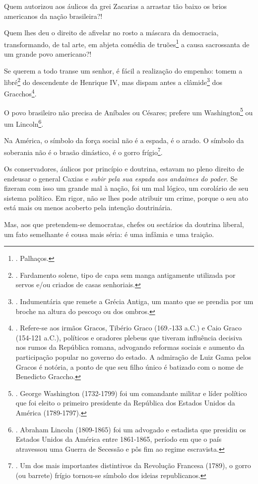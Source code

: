 Quem autorizou aos áulicos da grei Zacarias a arrastar tão baixo os
brios americanos da nação brasileira?!

Quem lhes deu o direito de afivelar no rosto a máscara da democracia,
transformando, de tal arte, em abjeta comédia de truões\footnote{.
  Palhaços.} a causa sacrossanta de um grande povo americano?!

Se querem a todo transe um senhor, é fácil a realização do empenho:
tomem a libré\footnote{. Fardamento solene, tipo de capa sem manga
  antigamente utilizada por servos e/ou criados de casas senhoriais.} do
descendente de Henrique IV, mas dispam antes a clâmide\footnote{.
  Indumentária que remete a Grécia Antiga, um manto que se prendia por
  um broche na altura do pescoço ou dos ombros.} dos
Gracchos\footnote{. Refere-se aos irmãos Gracos, Tibério Graco (169.-133
  a.C.) e Caio Graco (154-121 a.C.), políticos e oradores plebeus que
  tiveram influência decisiva nos rumos da República romana, advogando
  reformas sociais e aumento da participação popular no governo do
  estado. A admiração de Luiz Gama pelos Gracos é notória, a ponto de
  que seu filho único é batizado com o nome de Benedicto Graccho.}.

O povo brasileiro não precisa de Aníbales ou Césares; prefere um
Washington\footnote{. George Washington (1732-1799) foi um comandante
  militar e líder político que foi eleito o primeiro presidente da
  República dos Estados Unidos da América (1789-1797).} ou um
Lincoln\footnote{. Abraham Lincoln (1809-1865) foi um advogado e
  estadista que presidiu os Estados Unidos da América entre 1861-1865,
  período em que o país atravessou uma Guerra de Secessão e pôs fim ao
  regime escravista.}.

Na América, o símbolo da força social não é a espada, é o arado. O
símbolo da soberania não é o brasão dinástico, é o gorro
frígio\footnote{. Um dos mais importantes distintivos da Revolução
  Francesa (1789), o gorro (ou barrete) frígio tornou-se símbolo dos
  ideias republicanos.}.

Os conservadores, áulicos por princípio e doutrina, estavam no pleno
direito de endeusar o general Caxias e \emph{subir pela sua espada aos
andaimes do poder}. Se fizeram com isso um grande mal à nação, foi um
mal lógico, um corolário de seu sistema político. Em rigor, não se lhes
pode atribuir um crime, porque o seu ato está mais ou menos acoberto
pela intenção doutrinária.

Mas, aos que pretendem-se democratas, chefes ou sectários da doutrina
liberal, um fato semelhante é cousa mais séria: é uma infâmia e uma
traição.

